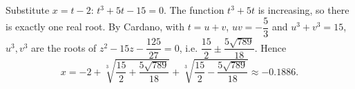Substitute $x=t-2$: $t^3+5t-15=0$. The function $t^3+5t$ is increasing, so there is exactly one real root. By Cardano, with $t=u+v$, $uv=-\dfrac53$ and $u^3+v^3=15$, $u^3,v^3$ are the roots of $z^2-15z-\dfrac{125}{27}=0$, i.e. $\dfrac{15}2\pm\dfrac{5\sqrt{789}}{18}$. Hence
\[x=-2+\sqrt[3]{\dfrac{15}2+\dfrac{5\sqrt{789}}{18}}+\sqrt[3]{\dfrac{15}2-\dfrac{5\sqrt{789}}{18}}\approx\boxed{-0.1886}.\]
